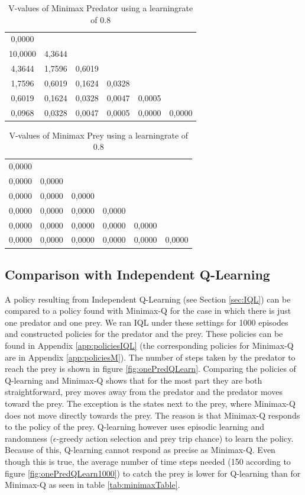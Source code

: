 \begin{table}[htb]
\centering
\begin{tabular}{cccccc}
0,0000 &  &  &  &  & \\
10,0000 & 4,3644 &  &  &  & \\ 
4,3644 & 1,7596 & 0,6019 &  &  & \\
1,7596 & 0,6019 & 0,1624 & 0,0328 &  & \\ 
0,6019 & 0,1624 & 0,0328 & 0,0047 & 0,0005 & \\ 
0,0968 & 0,0328 & 0,0047 & 0,0005 & 0,0000 & 0,0000\\ 
\end{tabular}
\caption{V-values of Minimax Predator using a learningrate of 0.8}
\label{tab:predM}
\end{table}

\begin{table}[htb]
\centering
\begin{tabular}{cccccc}
0,0000 &  &  &  &  & \\ 
0,0000 & 0,0000 &  &  &  & \\ 
0,0000 & 0,0000 & 0,0000 &  &  & \\ 
0,0000 & 0,0000 & 0,0000 & 0,0000 &  & \\ 
0,0000 & 0,0000 & 0,0000 & 0,0000 & 0,0000 & \\ 
0,0000 & 0,0000 & 0,0000 & 0,0000 & 0,0000 & 0,0000\\ 
\end{tabular}
\caption{V-values of Minimax Prey using a learningrate of 0.8}
\label{tab:preyM}
\end{table}

\FloatBarrier

\subsection{Comparison with Independent Q-Learning}\label{sec:comparisonIQLandMinimax}

A policy resulting from Independent Q-Learning (see Section \ref{sec:IQL}) can be compared to a policy found with Minimax-Q for the case in which there is just one predator and one prey. We ran IQL under these settings for 1000 episodes and constructed policies for the predator and the prey. These policies can be found in Appendix \ref{app:policiesIQL} (the corresponding policies for Minimax-Q are in Appendix \ref{app:policiesM}). The number of steps taken by the predator to reach the prey is shown in figure \ref{fig:onePredQLearn}. Comparing the policies of Q-learning and Minimax-Q shows that for the most part they are both straightforward, prey moves away from the predator and the predator moves toward the prey. The exception is the states next to the prey, where Minimax-Q does not move directly towards the prey. The reason is that Minimax-Q responds to the policy of the prey. Q-learning however uses episodic learning and randomness ($\epsilon$-greedy action selection and prey trip chance) to learn the policy. Because of this, Q-learning cannot respond as precise as Minimax-Q. Even though this is true, the average number of time steps needed (150 according to figure \ref{fig:onePredQLearn1000}) to catch the prey is lower for Q-learning than for Minimax-Q as seen in table \ref{tab:minimaxTable}.

